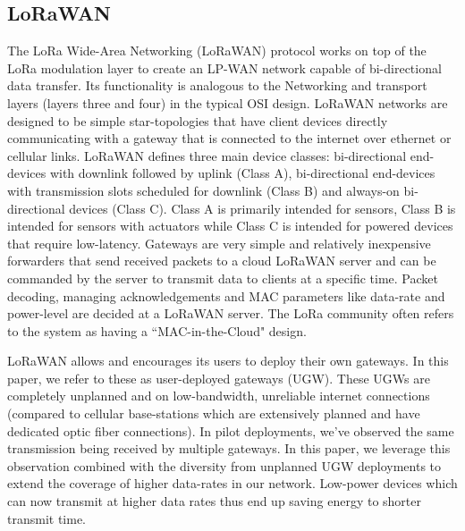 \subsection{LoRaWAN}
\label{sec:lorawan}

The LoRa Wide-Area Networking (LoRaWAN) protocol works on top of the LoRa
modulation layer to create an LP-WAN network capable of bi-directional data
transfer. Its functionality is analogous to the Networking and transport
layers (layers three and four) in the typical OSI design. LoRaWAN networks
are designed to be simple star-topologies that have client devices directly
communicating with a gateway that is connected to the internet over ethernet
or cellular links. LoRaWAN defines three main device classes: bi-directional
end-devices with downlink followed by uplink (Class A), bi-directional
end-devices with transmission slots scheduled for downlink (Class B) and
always-on bi-directional devices (Class C). Class A is primarily intended for
sensors, Class B is intended for sensors with actuators while Class C is
intended for powered devices that require low-latency. Gateways are very
simple and relatively inexpensive forwarders that send received packets to a
cloud LoRaWAN server and can be commanded by the server to transmit data to
clients at a specific time. Packet decoding, managing acknowledgements and
MAC parameters like data-rate and power-level are decided at a LoRaWAN
server. The LoRa community often refers to the system as having a
``MAC-in-the-Cloud" design.

LoRaWAN allows and encourages its users to deploy their own gateways. In this
paper, we refer to these as user-deployed gateways (UGW). These UGWs are
completely unplanned and on low-bandwidth, unreliable internet connections
(compared to cellular base-stations which are extensively planned and have
dedicated optic fiber connections). In pilot deployments, we've observed the
same transmission being received by multiple gateways. In this paper, we
leverage this observation combined with the diversity from unplanned UGW
deployments to extend the coverage of higher data-rates in our network.
Low-power devices which can now transmit at higher data rates thus end up
saving energy to shorter transmit time.
